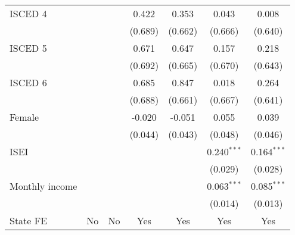 \begin{table}[htbp]
\begin{tabular}{lcccccc}
      ISCED 4        &                              &                   & 0.422                        & 0.353             & 0.043                        & 0.008\\   
                     &                              &                   & (0.689)                      & (0.662)           & (0.666)                      & (0.640)\\   
      ISCED 5        &                              &                   & 0.671                        & 0.647             & 0.157                        & 0.218\\   
                     &                              &                   & (0.692)                      & (0.665)           & (0.670)                      & (0.643)\\   
      ISCED 6        &                              &                   & 0.685                        & 0.847             & 0.018                        & 0.264\\   
                     &                              &                   & (0.688)                      & (0.661)           & (0.667)                      & (0.641)\\   
      Female         &                              &                   & -0.020                       & -0.051            & 0.055                        & 0.039\\   
                     &                              &                   & (0.044)                      & (0.043)           & (0.048)                      & (0.046)\\   
      ISEI           &                              &                   &                              &                   & 0.240$^{***}$                & 0.164$^{***}$\\   
                     &                              &                   &                              &                   & (0.029)                      & (0.028)\\   
      Monthly income &                              &                   &                              &                   & 0.063$^{***}$                & 0.085$^{***}$\\   
                     &                              &                   &                              &                   & (0.014)                      & (0.013)\\   
      State FE       & No                           & No                & Yes                          & Yes               & Yes                          & Yes\\  

\end{tabular}
\end{table}
